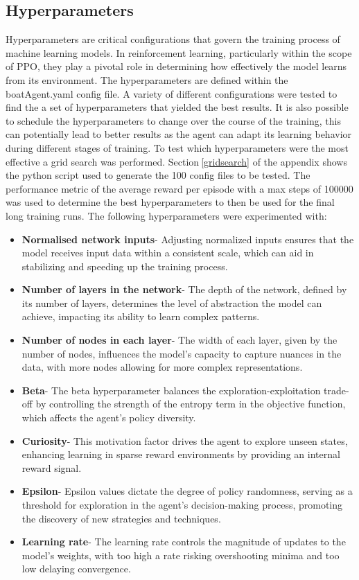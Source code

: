 \subsection{Hyperparameters}\label{sec:hyperparameters}
Hyperparameters are critical configurations that govern the training process of machine learning models. In reinforcement learning, particularly within the scope of PPO, they play a pivotal role in determining how effectively the model learns from its environment. The hyperparameters are defined within the boatAgent.yaml config file. A variety of different configurations were tested to find the a set of hyperparameters that yielded the best results. It is also possible to schedule the hyperparameters to change over the course of the training, this can potentially lead to better results as the agent can adapt its learning behavior during different stages of training. To test which hyperparameters were the most effective a grid search was performed. Section$~$\ref{gridsearch} of the appendix shows the python script used to generate the 100 config files to be tested. The performance metric of the average reward per episode with a max steps of 100000 was used to determine the best hyperparameters to then be used for the final long training runs. The following hyperparameters were experimented with:
\begin{itemize}
    \item \textbf{Normalised network inputs}- Adjusting normalized inputs ensures that the model receives input data within a consistent scale, which can aid in stabilizing and speeding up the training process.
    \item \textbf{Number of layers in the network}- The depth of the network, defined by its number of layers, determines the level of abstraction the model can achieve, impacting its ability to learn complex patterns.
    \item \textbf{Number of nodes in each layer}- The width of each layer, given by the number of nodes, influences the model's capacity to capture nuances in the data, with more nodes allowing for more complex representations.
    \item \textbf{Beta}- The beta hyperparameter balances the exploration-exploitation trade-off by controlling the strength of the entropy term in the objective function, which affects the agent's policy diversity.
    \item \textbf{Curiosity}- This motivation factor drives the agent to explore unseen states, enhancing learning in sparse reward environments by providing an internal reward signal.
    \item \textbf{Epsilon}- Epsilon values dictate the degree of policy randomness, serving as a threshold for exploration in the agent's decision-making process, promoting the discovery of new strategies and techniques.
    \item \textbf{Learning rate}- The learning rate controls the magnitude of updates to the model's weights, with too high a rate risking overshooting minima and too low delaying convergence.
\end{itemize}
